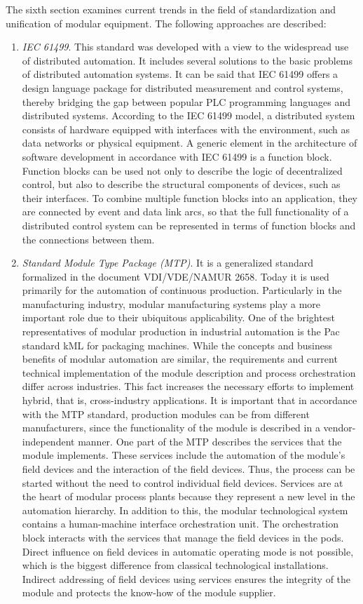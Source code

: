 The sixth section examines current trends in the field of standardization and unification of modular equipment. The following approaches are described:

\begin{enumerate}
	\item\textit {IEC 61499}. This standard was developed with a view to the widespread use of distributed automation. It includes several solutions to the basic problems of distributed automation systems. It can be said that IEC 61499 offers a design language package for distributed measurement and control systems, thereby bridging the gap between popular PLC programming languages ​​and distributed systems. According to the IEC 61499 model, a distributed system consists of hardware equipped with interfaces with the environment, such as data networks or physical equipment. A generic element in the architecture of software development in accordance with IEC 61499 is a function block. Function blocks can be used not only to describe the logic of decentralized control, but also to describe the structural components of devices, such as their interfaces. To combine multiple function blocks into an application, they are connected by event and data link arcs, so that the full functionality of a distributed control system can be represented in terms of function blocks and the connections between them.
	\item\textit{Standard Module Type Package (MTP)}. It is a generalized standard formalized in the document VDI/VDE/NAMUR 2658. Today it is used primarily for the automation of continuous production. Particularly in the manufacturing industry, modular manufacturing systems play a more important role due to their ubiquitous applicability. One of the brightest representatives of modular production in industrial automation is the Pac standard kML for packaging machines. While the concepts and business benefits of modular automation are similar, the requirements and current technical implementation of the module description and process orchestration differ across industries. This fact increases the necessary efforts to implement hybrid, that is, cross-industry applications. It is important that in accordance with the MTP standard, production modules can be from different manufacturers, since the functionality of the module is described in a vendor-independent manner. One part of the MTP describes the services that the module implements. These services include the automation of the module's field devices and the interaction of the field devices. Thus, the process can be started without the need to control individual field devices. Services are at the heart of modular process plants because they represent a new level in the automation hierarchy. In addition to this, the modular technological system contains a human-machine interface orchestration unit. The orchestration block interacts with the services that manage the field devices in the pods. Direct influence on field devices in automatic operating mode is not possible, which is the biggest difference from classical technological installations. Indirect addressing of field devices using services ensures the integrity of the module and protects the know-how of the module supplier.

\end{enumerate}

